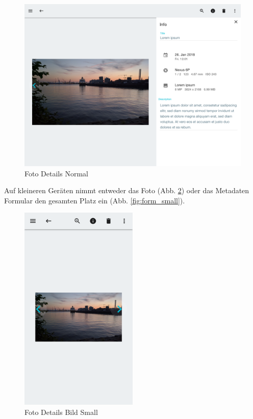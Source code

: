 \begin{figure}[htp]     %
\centering
\includegraphics[width=1.0\textwidth]{images/form_normal} 
\caption{Foto Details Normal}\label{fig:form_normal}
\end{figure}

Auf kleineren Geräten nimmt entweder das Foto (Abb. \ref{fig:details_small}) oder das Metadaten Formular den gesamten Platz ein (Abb. \ref{fig:form_small}). 

\begin{figure}[htp]     %
\centering
\includegraphics[width=0.5\textwidth]{images/details_small} 
\caption{Foto Details Bild Small}\label{fig:details_small}
\end{figure}

